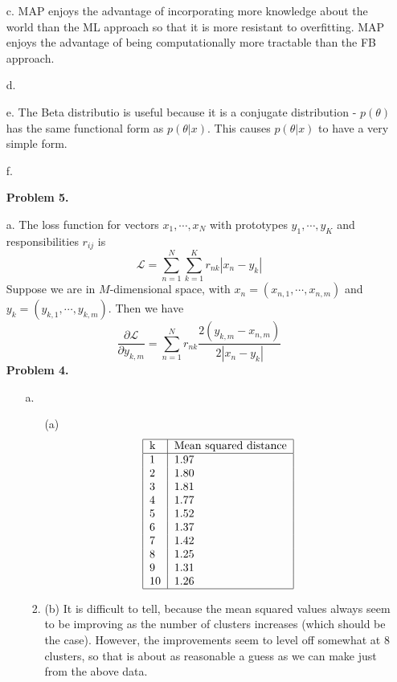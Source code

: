 \documentclass[12pt]{amsart}
\theoremstyle{remark}
\begin{document}
\begin{enumerate}
\begin{enumerate}
\item[c.]
MAP enjoys the advantage of incorporating more knowledge about the world than the ML approach so that it is more resistant to overfitting. MAP enjoys the advantage of being computationally more tractable than the FB approach.

\item[d.]

\item[e.]
The Beta distributio is useful because it is a conjugate distribution - $p(\theta)$ has the same functional form as $p(\theta|x)$. This causes $p(\theta|x)$ to have a very simple form.

\item[f.]

\noindent \textbf{Problem 5.}
\item[a.]
The loss function for vectors $x_1,\cdots,x_N$ with prototypes $y_1,\cdots,y_K$ and responsibilities $r_{ij}$ is
\[
\mathcal{L} = \sum_{n=1}^N \sum_{k=1}^K r_{nk}|x_n-y_k|
\]
Suppose we are in $M$-dimensional space, with $x_n=(x_{n,1},\cdots,x_{n,m})$ and $y_k=(y_{k,1},\cdots,y_{k,m})$. Then we have
\[
\frac{\partial \mathcal{L}}{\partial y_{k,m}}=\sum_{n=1}^N r_{nk}\frac{2(y_{k,m}-x_{n,m})}{2|x_n-y_k|}
\]
\noindent \textbf{Problem 4.}
\begin{enumerate}
\item[a.] 
\begin{enumerate}
\item[(a)] 
\[
\begin{tabular}{|l|l|}
\hline
k & Mean squared distance \\
\hline
1 &  1.97 \\
2 & 1.80 \\
3 & 1.81 \\
4 &  1.77 \\
5 & 1.52 \\
6 & 1.37 \\
7 & 1.42 \\
8 & 1.25 \\
9 & 1.31 \\
10 & 1.26 \\
\hline
\end{tabular}
\]
\item(b) It is difficult to tell, because the mean squared values always seem to be improving as the number of clusters increases (which should be the case). However, the improvements seem to level off somewhat at 8 clusters, so that is about as reasonable a guess as we can make just from the above data. 
\end{enumerate}



\end{enumerate}
\end{enumerate}
\end{enumerate}
\end{document}
